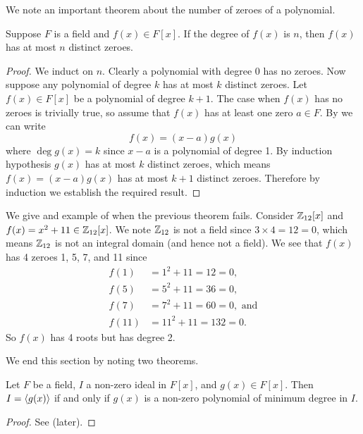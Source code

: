 We note an important theorem about the number of zeroes of a polynomial.
\begin{theorem}
    Suppose $F$ is a field and $f(x) \in F[x]$. If the degree of $f(x)$ is $n$, then $f(x)$ has at most $n$ distinct zeroes.
\end{theorem}
\begin{proof}
    We induct on $n$. Clearly a polynomial with degree 0 has no zeroes. Now suppose any polynomial of degree $k$ has at most $k$ distinct zeroes. Let $f(x) \in F[x]$ be a polynomial of degree $k + 1$. The case when $f(x)$ has no zeroes is trivially true, so assume that $f(x)$ has at least one zero $a \in F$. By  we can write
    \[
        f(x) = (x-a)g(x)
    \]
    where $\deg g(x) = k$ since $x-a$ is a polynomial of degree 1. By induction hypothesis $g(x)$ has at most $k$ distinct zeroes, which means $f(x) = (x-a)g(x)$ has at most $k + 1$ distinct zeroes. Therefore by induction we establish the required result.
\end{proof}

\begin{example}
    We give and example of when the previous theorem fails. Consider $\mathbb{Z}_{12}[x]$ and $f(x) = x^2 + 11 \in \mathbb{Z}_{12}[x]$. We note $\mathbb{Z}_{12}$ is not a field since $3 \times 4 = 12 = 0$, which means $\mathbb{Z}_{12}$ is not an integral domain (and hence not a field). We see that $f(x)$ has 4 zeroes 1, 5, 7, and 11 since
    \begin{align*}
        f(1) &= 1^2 + 11 = 12 = 0,\\
        f(5) &= 5^2 + 11 = 36 = 0,\\
        f(7) &= 7^2 + 11 = 60 = 0, \text{ and}\\
        f(11) &= 11^2 + 11 = 132 = 0.
    \end{align*}
    So $f(x)$ has 4 roots but has degree 2.
\end{example}

We end this section by noting two theorems.
\begin{theorem}\label{thrm-criterion-for-principal-ideal-in-polynomial-field}
    Let $F$ be a field, $I$ a non-zero ideal in $F[x]$, and $g(x) \in F[x]$. Then $I = \left\langle g(x)\right\rangle$ if and only if $g(x)$ is a non-zero polynomial of minimum degree in $I$.
\end{theorem}
\begin{proof}
    See  (later).
\end{proof}

